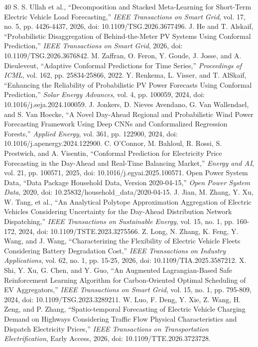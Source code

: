 \documentclass[journal]{IEEEtran}
\begin{document}
\begin{thebibliography}{40}
 S. S. Ullah et al., ``Decomposition and Stacked Meta-Learning for Short-Term Electric Vehicle Load Forecasting,'' \emph{IEEE Transactions on Smart Grid}, vol. 17, no. 5, pp. 4426-4437, 2026, doi: 10.1109/TSG.2026.3677496.
 J. He and T. Alskaif, ``Probabilistic Disaggregation of Behind-the-Meter PV Systems Using Conformal Prediction,'' \emph{IEEE Transactions on Smart Grid}, 2026, doi: 10.1109/TSG.2026.3676842.
 M. Zaffran, O. Feron, Y. Goude, J. Josse, and A. Dieuleveut, ``Adaptive Conformal Predictions for Time Series,'' \emph{Proceedings of ICML}, vol. 162, pp. 25834-25866, 2022.
 Y. Renkema, L. Visser, and T. AlSkaif, ``Enhancing the Reliability of Probabilistic PV Power Forecasts Using Conformal Prediction,'' \emph{Solar Energy Advances}, vol. 4, pp. 100059, 2024, doi: 10.1016/j.seja.2024.100059.
 J. Jonkers, D. Nieves Avendano, G. Van Wallendael, and S. Van Hoecke, ``A Novel Day-Ahead Regional and Probabilistic Wind Power Forecasting Framework Using Deep CNNs and Conformalized Regression Forests,'' \emph{Applied Energy}, vol. 361, pp. 122900, 2024, doi: 10.1016/j.apenergy.2024.122900.
 C. O'Connor, M. Bahloul, R. Rossi, S. Prestwich, and A. Visentin, ``Conformal Prediction for Electricity Price Forecasting in the Day-Ahead and Real-Time Balancing Market,'' \emph{Energy and AI}, vol. 21, pp. 100571, 2025, doi: 10.1016/j.egyai.2025.100571.
 Open Power System Data, ``Data Package Household Data, Version 2020-04-15,'' \emph{Open Power System Data}, 2020, doi: 10.25832/household\_data/2020-04-15.
 J. Jian, M. Zhang, Y. Xu, W. Tang, et al., ``An Analytical Polytope Approximation Aggregation of Electric Vehicles Considering Uncertainty for the Day-Ahead Distribution Network Dispatching,'' \emph{IEEE Transactions on Sustainable Energy}, vol. 15, no. 1, pp. 160-172, 2024, doi: 10.1109/TSTE.2023.3275566.
 Z. Long, N. Zhang, K. Feng, Y. Wang, and J. Wang, ``Characterizing the Flexibility of Electric Vehicle Fleets Considering Battery Degradation Cost,'' \emph{IEEE Transactions on Industry Applications}, vol. 62, no. 1, pp. 15-25, 2026, doi: 10.1109/TIA.2025.3587212.
 X. Shi, Y. Xu, G. Chen, and Y. Guo, ``An Augmented Lagrangian-Based Safe Reinforcement Learning Algorithm for Carbon-Oriented Optimal Scheduling of EV Aggregators,'' \emph{IEEE Transactions on Smart Grid}, vol. 15, no. 1, pp. 795-809, 2024, doi: 10.1109/TSG.2023.3289211.
 W. Luo, F. Deng, Y. Xie, Z. Wang, H. Zeng, and P. Zhang, ``Spatio-temporal Forecasting of Electric Vehicle Charging Demand on Highways Considering Traffic Flow Physical Characteristics and Dispatch Electricity Prices,'' \emph{IEEE Transactions on Transportation Electrification}, Early Access, 2026, doi: 10.1109/TTE.2026.3723728.
\end{thebibliography}
\end{document}
